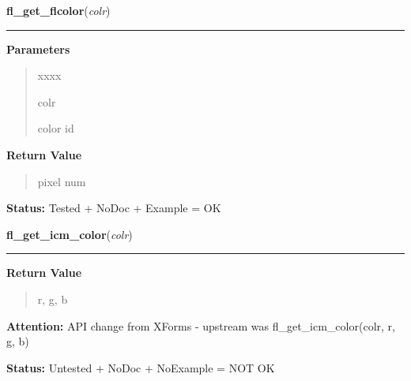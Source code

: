 \hspace{.8\funcindent}\begin{boxedminipage}{\funcwidth}

    \raggedright \textbf{fl\_get\_flcolor}(\textit{colr})

    \vspace{-1.5ex}

    \rule{\textwidth}{0.5\fboxrule}
\setlength{\parskip}{2ex}
\setlength{\parskip}{1ex}
      \textbf{Parameters}
      \vspace{-1ex}

      \begin{quote}
        \begin{Ventry}{xxxx}

          \item[colr]

          color id

        \end{Ventry}

      \end{quote}

      \textbf{Return Value}
    \vspace{-1ex}

      \begin{quote}
      pixel num

      \end{quote}

\textbf{Status:} Tested + NoDoc + Example = OK



    \end{boxedminipage}

    \label{xformslib:library:fl_get_icm_color}

    \vspace{0.5ex}

\hspace{.8\funcindent}\begin{boxedminipage}{\funcwidth}

    \raggedright \textbf{fl\_get\_icm\_color}(\textit{colr})

    \vspace{-1.5ex}

    \rule{\textwidth}{0.5\fboxrule}
\setlength{\parskip}{2ex}
\setlength{\parskip}{1ex}
      \textbf{Return Value}
    \vspace{-1ex}

      \begin{quote}
      r, g, b

      \end{quote}

\textbf{Attention:} API change from XForms - upstream was fl\_get\_icm\_color(colr, r, g, b)



\textbf{Status:} Untested + NoDoc + NoExample = NOT OK



    \end{boxedminipage}

